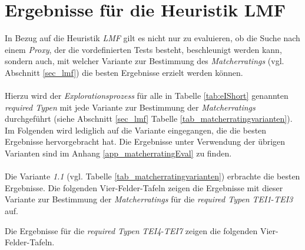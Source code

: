 \section{Ergebnisse für die Heuristik LMF}\label{sec_evalLMF}
In Bezug auf die \Gls{Heuristik} \emph{LMF} gilt es nicht nur zu evaluieren, ob die Suche nach einem \emph{Proxy}, der die vordefinierten Tests besteht, beschleunigt werden kann, sondern auch, mit welcher Variante zur Bestimmung des \emph{Matcherratings} (vgl. Abschnitt \ref{sec_lmf}) die besten Ergebnisse erzielt werden können. 
\\\\
Hierzu wird der \emph{Explorationsprozess} für alle in Tabelle \ref{tab:eIShort} genannten \emph{required Typen} mit jede Variante zur Bestimmung der \emph{Matcherratings} durchgeführt (siehe Abschnitt \ref{sec_lmf} Tabelle \ref{tab_matcherratingvarianten}). Im Folgenden wird lediglich auf die Variante eingegangen, die die besten Ergebnisse hervorgebracht hat. Die Ergebnisse unter Verwendung der übrigen Varianten sind im Anhang \ref{app_matcherratingEval} zu finden.
\\\\
Die Variante \emph{1.1} (vgl. Tabelle \ref{tab_matcherratingvarianten}) erbrachte die besten Ergebnisse. Die folgenden Vier-Felder-Tafeln zeigen die Ergebnisse mit dieser Variante zur Bestimmung der \emph{Matcherratings} für die \emph{required Typen} \emph{TEI1}-\emph{TEI3} auf.
\begin{multicols}{3}
\end{multicols}
\noindent
Die Ergebnisse für die \emph{required Typen} \emph{TEI4}-\emph{TEI7} zeigen die folgenden Vier-Felder-Tafeln. 
\begin{multicols}{2}
\end{multicols}

\begin{multicols}{2}
\end{multicols}

